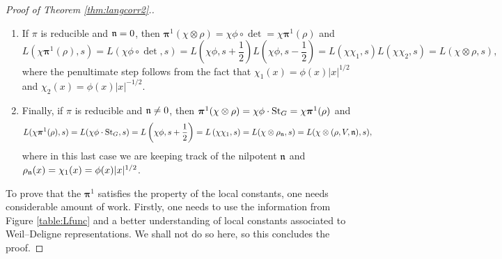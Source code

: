 \begin{proof}[Proof of Theorem \ref{thm:langcorr2}.]
\begin{enumerate}[(1)]
        where the representations on the right hand side of $(\dagger)$ are viewed as representations of $\mathcal{W}_F$.
        \item If $\pi$ is reducible and $\mathfrak{n}=0$, then $\bm\pi^1(\chi\otimes\rho)=\chi\phi\circ\det=\chi\bm\pi^1(\rho)$ and
        $$L(\chi\bm\pi^1(\rho),s)=L(\chi\phi\circ\det,s)=L\left(\chi\phi,s+\frac{1}{2}\right)L\left(\chi\phi,s-\frac{1}{2}\right)=L\left(\chi\chi_1,s\right)L\left(\chi\chi_2,s\right)=L(\chi\otimes\rho,s),$$
        where the penultimate step follows from the fact that $\chi_1(x)=\phi(x)|x|^{1/2}$ and $\chi_2(x)=\phi(x)|x|^{-1/2}$.
        \item Finally, if $\pi$ is reducible and $\mathfrak{n}\neq0$, then $\bm\pi^1(\chi\otimes\rho)=\chi\phi\cdot\mathrm{St}_G=\chi\bm\pi^1(\rho)$ and
        $$L(\chi\bm\pi^1(\rho),s)=L(\chi\phi\cdot\mathrm{St}_G,s)=L\left(\chi\phi,s+\frac{1}{2}\right)=L\left(\chi\chi_1,s\right)=L(\chi\otimes\rho_{\mathfrak{n}},s)=L(\chi\otimes(\rho,V,\mathfrak{n}),s),$$
        where in this last case we are keeping track of the nilpotent $\mathfrak{n}$ and $\rho_{\mathfrak{n}}(x)=\chi_1(x)=\phi(x)|x|^{1/2}$.
    \end{enumerate}
    To prove that the $\bm\pi^1$ satisfies the property of the local constants, one needs considerable amount of work. Firstly, one needs to use the information from Figure \ref{table:Lfunc} and a better understanding of local constants associated to Weil--Deligne representations. We shall not do so here, so this concludes the proof.
\end{proof}








\newpage